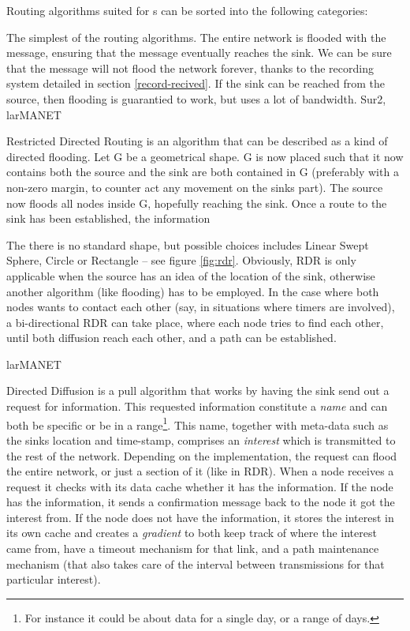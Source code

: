 \documentclass[letter, 12pt, english, draft]{article}
\begin{document}
Routing algorithms suited for \manet s can be sorted into the following categories:
\begin{description}
{The simplest of the routing algorithms. The entire network is flooded with the message, ensuring that the message eventually reaches the sink. We can be sure that the message will not flood the network forever, thanks to the recording system detailed in section \ref{record-recived}. If the sink can be reached from the source, then flooding is  guarantied to work, but uses a lot of bandwidth.}
{Sur2, larMANET} 


      {Restricted Directed Routing is an algorithm that can be described as a kind of directed flooding. Let G be a geometrical shape. G is now placed such that it now contains both the source and the sink are both contained in G (preferably with a non-zero margin, to counter act any movement on the sinks part). The source now floods all nodes inside G, hopefully reaching the sink. Once a route to the sink has been established, the information

The there is no standard shape, but possible choices includes Linear Swept Sphere, Circle or Rectangle -- see figure \ref{fig:rdr}. Obviously, RDR is only applicable when the source has an idea of the location of the sink, otherwise another algorithm (like flooding) has to be employed. In the case where both nodes wants to contact each other (say, in situations where timers are involved), a bi-directional RDR can take place, where each node tries to find each other, until both diffusion reach each other, and a path can be established.}
{larMANET}

{Directed Diffusion is a pull algorithm that works by having the sink send out a request for information. This requested information constitute a \emph{name} and can both be specific or be in a range\footnote{For instance it could be about data for a single day, or a range of days.}. This name, together with meta-data such as the sinks location and time-stamp, comprises an \emph{interest} which is transmitted to the rest of the network. Depending on the implementation, the request can flood the entire network, or just a section of it (like in RDR). When a node receives a request it checks with its data cache whether it has the information. If the node has the information, it sends a confirmation message back to the node it got the interest from. If the node does not have the information, it stores the interest in its own cache and creates a \emph{gradient} to both keep track of where the interest came from, have a timeout mechanism for that link, and a path maintenance mechanism (that also takes care of the interval between transmissions for that particular interest). 

}
\end{description}
\end{document}
